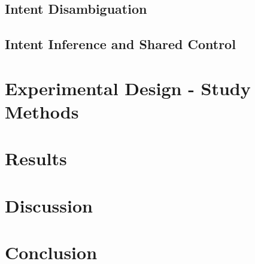 \subsection{Intent Disambiguation}
\subsection{Intent Inference and Shared Control}\label{IISC}
\section{Experimental Design - Study Methods}
\section{Results}
\section{Discussion}
\section{Conclusion}




